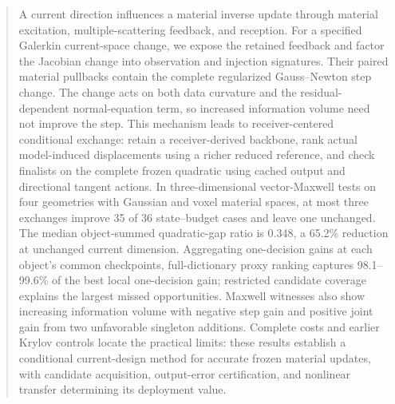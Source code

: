 \begin{abstract}
A current direction influences a material inverse update through material excitation, multiple-scattering feedback, and reception. For a specified Galerkin current-space change, we expose the retained feedback and factor the Jacobian change into observation and injection signatures. Their paired material pullbacks contain the complete regularized Gauss--Newton step change. The change acts on both data curvature and the residual-dependent normal-equation term, so increased information volume need not improve the step. This mechanism leads to receiver-centered conditional exchange: retain a receiver-derived backbone, rank actual model-induced displacements using a richer reduced reference, and check finalists on the complete frozen quadratic using cached output and directional tangent actions. In three-dimensional vector-Maxwell tests on four geometries with Gaussian and voxel material spaces, at most three exchanges improve 35 of 36 state--budget cases and leave one unchanged. The median object-summed quadratic-gap ratio is 0.348, a 65.2\% reduction at unchanged current dimension. Aggregating one-decision gains at each object's common checkpoints, full-dictionary proxy ranking captures 98.1--99.6\% of the best local one-decision gain; restricted candidate coverage explains the largest missed opportunities. Maxwell witnesses also show increasing information volume with negative step gain and positive joint gain from two unfavorable singleton additions. Complete costs and earlier Krylov controls locate the practical limits: these results establish a conditional current-design method for accurate frozen material updates, with candidate acquisition, output-error certification, and nonlinear transfer determining its deployment value.
\end{abstract}
